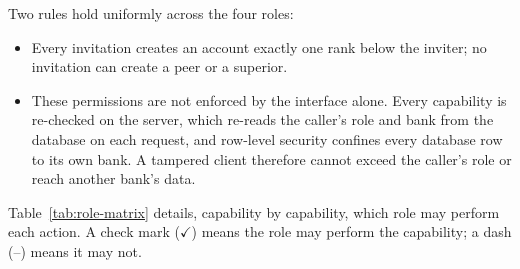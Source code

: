 \noindent Two rules hold uniformly across the four roles:
\begin{itemize}
  \item Every invitation creates an account exactly one rank below the inviter; no invitation can create a peer or a superior.
  \item These permissions are not enforced by the interface alone. Every capability is re-checked on the server, which re-reads the caller's role and bank from the database on each request, and row-level security confines every database row to its own bank. A tampered client therefore cannot exceed the caller's role or reach another bank's data.
\end{itemize}

\noindent Table~\ref{tab:role-matrix} details, capability by capability, which role may perform each action. A check mark ($\checkmark$) means the role may perform the capability; a dash (--) means it may not.

